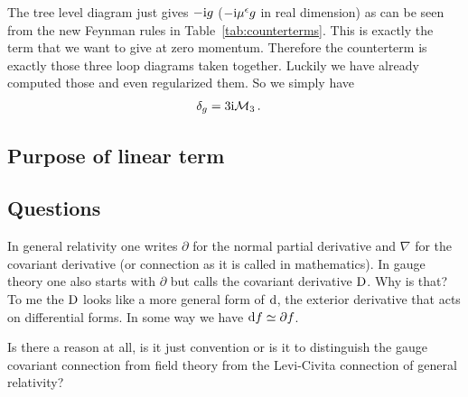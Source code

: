 \documentclass[11pt, english, fleqn, DIV=15, headinclude]{scrartcl}
\begin{document}
The tree level diagram just gives $- \mathrm i g$ ($- \mathrm i \mu^\epsilon g$ in
real dimension) as can be seen from the new Feynman rules in
Table~\ref{tab:counterterms}. This is exactly the term that we want to give at
zero momentum. Therefore the counterterm is exactly those three loop diagrams
taken together. Luckily we have already computed those and even regularized
them. So we simply have
\begin{align*}
    \delta_g
    &= 3 \mathrm i \mathcal M_3 \,.
\end{align*}

\subsection{Purpose of linear term}

\begin{appendix}
    \section{Questions} 

\begin{question}
    In general relativity one writes $\partial$ for the normal partial
    derivative and $\nabla$ for the covariant derivative (or connection as it
    is called in mathematics). In gauge theory one also starts with $\partial$
    but calls the covariant derivative $\mathop{}\!\mathrm D$. Why is that? To me the $\mathop{}\!\mathrm D$
    looks like a more general form of $\mathop{}\!\mathrm d$, the exterior derivative that acts
    on differential forms. In some way we have $\dif f \simeq \vec\partial f$.

    Is there a reason at all, is it just convention or is it to distinguish the
    gauge covariant connection from field theory from the Levi-Civita
    connection of general relativity?
\end{question}

\end{appendix}
\end{document}

